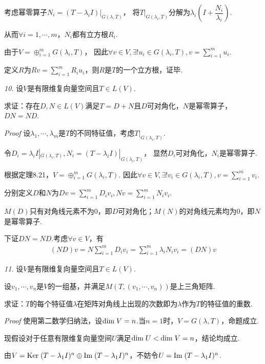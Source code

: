 考虑幂零算子\(N_i=(T-\lambda_i I)|_{G(\lambda,T)}\)，
将\(T|_{G(\lambda_i,T)}\)分解为\(\lambda_i(I+\dfrac{N_i}{\lambda_i})\).

从而\(\forall i=1,\cdots,m\)，\(N_i\)都有立方根\(R_i\).

由于\(V=\oplus_{i=1}^m G(\lambda_i,T)\)，
因此\(\forall v \in V,\exists! u_i \in G(\lambda_i,T),v=\sum_{i=1}^m u_i\).

定义\(R\)为\(Rv=\sum_{i=1}^m R_iu_i\)，则\(R\)是\(T\)的一个立方根，证毕.

\newpage

\textit{10.}
设\(V\)是有限维复向量空间且\(T \in L(V)\).

求证：存在\(D,N \in L(V)\)满足\(T=D+N\)且\(D\)可对角化，\(N\)是幂零算子，\(DN=ND\).

\textit{Proof}
设\(\lambda_1,\cdots,\lambda_m\)是\(T\)的不同特征值，考虑\(T|_{G(\lambda_i,T)}\).

令\(D_i=\lambda_i I|_{G(\lambda_i,T)},N_i=(T-\lambda_i I)|_{G(\lambda_i,T)}\)，
显然\(D_i\)可对角化，\(N_i\)是幂零算子.

根据定理8.21，\(V=\oplus_{i=1}^m G(\lambda_i,T)\).
因此\(\forall v \in V,\exists! v_i \in G(\lambda_i,T),v=\sum_{i=1}^m v_i\).

分别定义\(D\)和\(N\)为\(Dv=\sum_{i=1}^m D_iv_i,Nv=\sum_{i=1}^m N_iv_i\).

\(M(D)\)只有对角线元素不为\(0\)，即\(D\)可对角化；\(M(N)\)的对角线元素均为\(0\)，即\(N\)是幂零算子.

下证\(DN=ND\).考虑\(\forall v \in V\)，有
    \begin{align*}
        (ND)v=N\sum_{i=1}^m D_iv_i=\sum_{i=1}^m \lambda_iN_iv_i=(DN)v
    \end{align*}

\hspace*{\fill}

\textit{11.}
设\(V\)是有限维复向量空间且\(T \in L(V)\).

设\(v_1,\cdots,v_n\)是\(V\)的一组基，并满足\(M(T,(v_1,\cdots,v_n))\)是上三角矩阵.

求证：\(T\)的每个特征值\(\lambda\)在矩阵对角线上出现的次数即为\(\lambda\)作为\(T\)的特征值的重数.

\textit{Proof}
使用第二数学归纳法，设\(\mathrm{dim \;} V=n\).当\(n=1\)时，\(V=G(\lambda,T)\)，命题成立.

现假设对于任意有限维复向量空间\(U\)满足\(\mathrm{dim \;} U<\mathrm{dim \;} V=n\)，结论均成立.

由\(V=\mathrm{Ker \;} (T-\lambda_1 I)^n \oplus \mathrm{Im \;} (T-\lambda_1 I)^n\)，不妨令\(U=\mathrm{Im \;} (T-\lambda_1 I)^n\).

